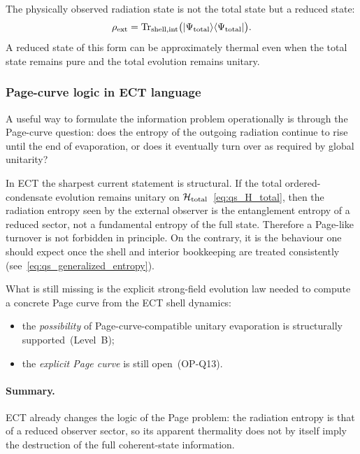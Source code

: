 \documentclass[11pt,a4paper]{article}
\numberwithin{equation}{section}
\begin{document}
The physically observed radiation state is not the total state but
a reduced state:
\begin{equation}
  \label{eq:qs_rho_ext}
  \rho_{\rm ext}
  =
  \mathrm{Tr}_{{\rm shell,int}}
  \bigl(|\Psi_{\rm total}\rangle\langle\Psi_{\rm total}|\bigr).
\end{equation}
A reduced state of this form can be approximately thermal even when
the total state remains pure and the total evolution remains unitary.

\subsubsection*{Page-curve logic in ECT language}

A useful way to formulate the information problem operationally is through
the Page-curve question: does the entropy of the outgoing radiation
continue to rise until the end of evaporation, or does it eventually turn
over as required by global unitarity?

In ECT the sharpest current statement is structural.
If the total ordered-condensate evolution remains unitary on
$\mathcal{H}_{\rm total}$~\eqref{eq:qs_H_total}, then the radiation
entropy seen by the external observer is the entanglement entropy of a
reduced sector, not a fundamental entropy of the full state.
Therefore a Page-like turnover is not forbidden in principle.
On the contrary, it is the behaviour one should expect once the shell and
interior bookkeeping are treated consistently
(see~\eqref{eq:qs_generalized_entropy}).

What is still missing is the explicit strong-field evolution law needed to
compute a concrete Page curve from the ECT shell dynamics:
\begin{itemize}
  \item the \emph{possibility} of Page-curve-compatible unitary
    evaporation is structurally supported~(Level~B);
  \item the \emph{explicit Page curve} is still open~(OP-Q13).
\end{itemize}

\paragraph{Summary.}
ECT already changes the logic of the Page problem: the radiation entropy
is that of a reduced observer sector, so its apparent thermality does not
by itself imply the destruction of the full coherent-state information.
\end{document}
